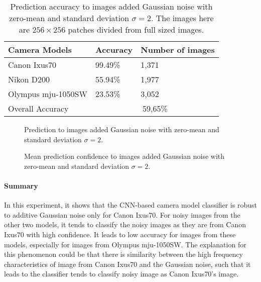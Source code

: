 \documentclass[a4paper, 9pt, twocolumn]{extarticle}
\begin{document}
\begin{table}
	\center
	\begin{tabular}{ |p{3.2cm}|p{1.4cm}|p{2.6cm}| }
		\hline
		Camera Models & Accuracy & Number of images \\
		\hline
		Canon Ixus70 & 99.49\% & 1,371 \\
		Nikon D200 & 55.94\% & 1,977 \\
		Olympus mju-1050SW & 23.53\% & 3,052 \\
		\hline
		Overall Accuracy & \multicolumn{2}{c|}{59,65\%} \\
		\hline
	\end{tabular}
	\caption{\label{tab:noise} Prediction accuracy to images added Gaussian noise with zero-mean and standard deviation $ \sigma = 2 $. The images here are $ 256 \times 256 $ patches divided from full sized images.}
\end{table}

\begin{figure}
\centering
\resizebox{!}{!}{
	{}
}
\caption{Prediction to images added Gaussian noise with zero-mean and standard deviation $ \sigma = 2 $.}
\label{fig:noise result}
\end{figure}


\begin{figure}
	\centering
	\resizebox{!}{!}{
		{}
	}
	\caption{Mean prediction confidence to images added Gaussian noise with zero-mean and standard deviation $ \sigma = 2 $.}
	\label{fig:noise confidence}
\end{figure}

\paragraph{Summary}
\label{section:noise summary}

In this experiment, it shows that the CNN-based camera model classifier is robust to additive Gaussian noise only for Canon Ixus70. For noisy images from the other two models, it tends to classify the noisy images as they are from Canon Ixus70 with high confidence. It leads to low accuracy for images from these models, especially for images from Olympus mju-1050SW. The explanation for this phenomenon could be that there is similarity between the high frequency characteristics of image from Canon Ixus70 and the Gaussian noise, such that it leads to the classifier tends to classify noisy image as Canon Ixus70's image.
\end{document}
